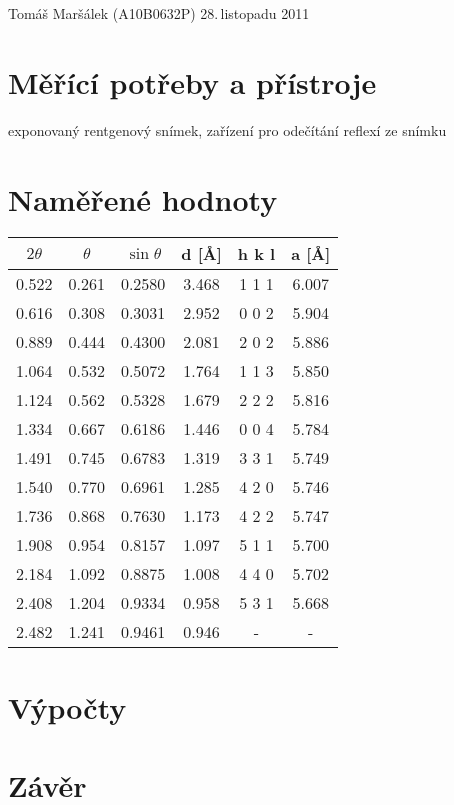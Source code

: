 \documentclass[11pt]{article}
\begin{document}
 {Tomáš Maršálek}
 {(A10B0632P)}
 {28.\,listopadu 2011}

\section{Měřící potřeby a přístroje}
exponovaný rentgenový snímek, zařízení pro odečítání reflexí ze snímku

\section{Naměřené hodnoty}
\begin{center}
\begin{tabular}{|c|c|c|c|c|c|}
\hline
$2\theta$ & $\theta$ & $\sin\theta$ & d [\AA] & h k l & a [\AA] \\
\hline
0.522 & 0.261 & 0.2580 & 3.468 & 1 1 1 & 6.007 \\
0.616 & 0.308 & 0.3031 & 2.952 & 0 0 2 & 5.904 \\
0.889 & 0.444 & 0.4300 & 2.081 & 2 0 2 & 5.886 \\
1.064 & 0.532 & 0.5072 & 1.764 & 1 1 3 & 5.850 \\
1.124 & 0.562 & 0.5328 & 1.679 & 2 2 2 & 5.816 \\
1.334 & 0.667 & 0.6186 & 1.446 & 0 0 4 & 5.784 \\
1.491 & 0.745 & 0.6783 & 1.319 & 3 3 1 & 5.749 \\
1.540 & 0.770 & 0.6961 & 1.285 & 4 2 0 & 5.746 \\
1.736 & 0.868 & 0.7630 & 1.173 & 4 2 2 & 5.747 \\
1.908 & 0.954 & 0.8157 & 1.097 & 5 1 1 & 5.700 \\
2.184 & 1.092 & 0.8875 & 1.008 & 4 4 0 & 5.702 \\
2.408 & 1.204 & 0.9334 & 0.958 & 5 3 1 & 5.668 \\
2.482 & 1.241 & 0.9461 & 0.946 & -     & -     \\
\hline
\end{tabular}
\end{center}
\section{Výpočty}
\section{Závěr} 
\end{document}
